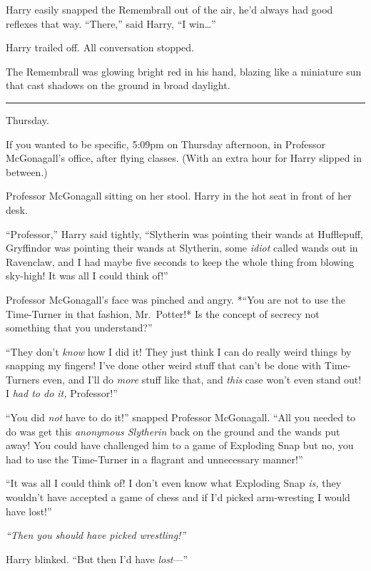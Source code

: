 Harry easily snapped the Remembrall out of the air, he'd always had good
reflexes that way. ``There,'' said Harry, ``I win\ldots{}''

Harry trailed off. All conversation stopped.

The Remembrall was glowing bright red in his hand, blazing like a
miniature sun that cast shadows on the ground in broad daylight.

\begin{center}\rule{3in}{0.4pt}\end{center}

Thursday.

If you wanted to be specific, 5:09pm on Thursday afternoon, in Professor
McGonagall's office, after flying classes. (With an extra hour for Harry
slipped in between.)

Professor McGonagall sitting on her stool. Harry in the hot seat in
front of her desk.

``Professor,'' Harry said tightly, ``Slytherin was pointing their wands
at Hufflepuff, Gryffindor was pointing their wands at Slytherin, some
\emph{idiot} called wands out in Ravenclaw, and I had maybe five seconds
to keep the whole thing from blowing sky-high! It was all I could think
of!''

Professor McGonagall's face was pinched and angry. *``You are not to use
the Time-Turner in that fashion, Mr.~Potter!* Is the concept of secrecy
not something that you understand?''

``They don't \emph{know} how I did it! They just think I can do really
weird things by snapping my fingers! I've done other weird stuff that
can't be done with Time-Turners even, and I'll do \emph{more} stuff like
that, and \emph{this} case won't even stand out! I \emph{had to do it,}
Professor!''

``You did \emph{not} have to do it!'' snapped Professor McGonagall.
``All you needed to do was get this \emph{anonymous Slytherin} back on
the ground and the wands put away! You could have challenged him to a
game of Exploding Snap but no, you had to use the Time-Turner in a
flagrant and unnecessary manner!''

``It was all I could think of! I don't even know what Exploding Snap
\emph{is,} they wouldn't have accepted a game of chess and if I'd picked
arm-wresting I would have lost!''

\emph{``Then you should have picked wrestling!''}

Harry blinked. ``But then I'd have \emph{lost}---''

